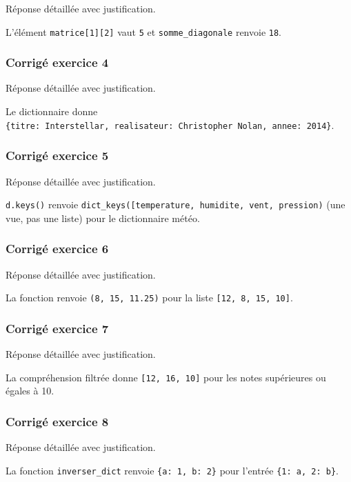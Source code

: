 Réponse détaillée avec justification.

L'élément \texttt{matrice{[}1{]}{[}2{]}} vaut \texttt{5} et
\texttt{somme\_diagonale} renvoie \texttt{18}.

\subsubsection{Corrigé exercice 4}

Réponse détaillée avec justification.

Le dictionnaire donne
\texttt{\{\textquotesingle{}titre\textquotesingle{}:\ \textquotesingle{}Interstellar\textquotesingle{},\ \textquotesingle{}realisateur\textquotesingle{}:\ \textquotesingle{}Christopher\ Nolan\textquotesingle{},\ \textquotesingle{}annee\textquotesingle{}:\ 2014\}}.

\subsubsection{Corrigé exercice 5}

Réponse détaillée avec justification.

\texttt{d.keys()} renvoie
\texttt{dict\_keys({[}\textquotesingle{}temperature\textquotesingle{},\ \textquotesingle{}humidite\textquotesingle{},\ \textquotesingle{}vent\textquotesingle{},\ \textquotesingle{}pression\textquotesingle{}{]})}
(une vue, pas une liste) pour le dictionnaire météo.

\subsubsection{Corrigé exercice 6}

Réponse détaillée avec justification.

La fonction renvoie \texttt{(8,\ 15,\ 11.25)} pour la liste
\texttt{{[}12,\ 8,\ 15,\ 10{]}}.

\subsubsection{Corrigé exercice 7}

Réponse détaillée avec justification.

La compréhension filtrée donne \texttt{{[}12,\ 16,\ 10{]}} pour les
notes supérieures ou égales à 10.

\subsubsection{Corrigé exercice 8}

Réponse détaillée avec justification.

La fonction \texttt{inverser\_dict} renvoie
\texttt{\{\textquotesingle{}a\textquotesingle{}:\ 1,\ \textquotesingle{}b\textquotesingle{}:\ 2\}}
pour l'entrée
\texttt{\{1:\ \textquotesingle{}a\textquotesingle{},\ 2:\ \textquotesingle{}b\textquotesingle{}\}}.
